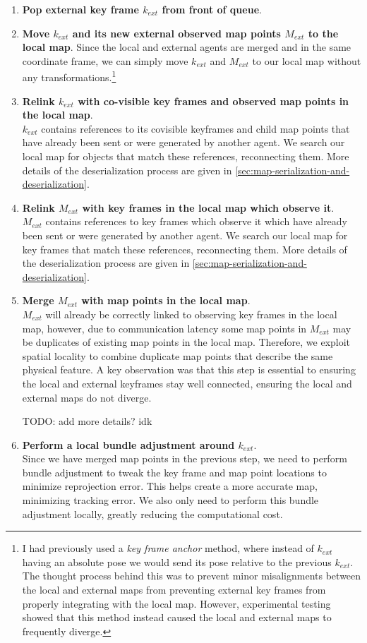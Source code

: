 \begin{enumerate}
    \item \textbf{Pop external key frame $k_{ext}$ from front of queue}.
    \item \textbf{Move $k_{ext}$ and its new external observed map points $M_{ext}$ to the local map}.
          Since the local and external agents are merged and in the same coordinate frame, we can simply move $k_{ext}$ and $M_{ext}$ to our local map without any transformations.\footnote[1]{I had previously used a \textit{key frame anchor} method, where instead of $k_{ext}$ having an absolute pose we would send its pose relative to the previous $k_{ext}$. The thought process behind this was to prevent minor misalignments between the local and external maps from preventing external key frames from properly integrating with the local map. However, experimental testing showed that this method instead caused the local and external maps to frequently diverge.}
    \item \textbf{Relink $k_{ext}$ with co-visible key frames and observed map points in the local map}. \\
          $k_{ext}$ contains references to its covisible keyframes and child map points that have already been sent or were generated by another agent. We search our local map for objects that match these references, reconnecting them. More details of the deserialization process are given in \autoref{sec:map-serialization-and-deserialization}.
    \item \textbf{Relink $M_{ext}$ with key frames in the local map which observe it}. \\
          $M_{ext}$ contains references to key frames which observe it which have already been sent or were generated by another agent. We search our local map for key frames that match these references, reconnecting them. More details of the deserialization process are given in \autoref{sec:map-serialization-and-deserialization}.
    \item \textbf{Merge $M_{ext}$ with map points in the local map}. \\
          $M_{ext}$ will already be correctly linked to observing key frames in the local map, however, due to communication latency some map points in $M_{ext}$ may be duplicates of existing map points in the local map. Therefore, we exploit spatial locality to combine duplicate map points that describe the same physical feature. A key observation was that this step is essential to ensuring the local and external keyframes stay well connected, ensuring the local and external maps do not diverge.

          TODO: add more details? idk
    \item \textbf{Perform a local bundle adjustment around $k_{ext}$}. \\
          Since we have merged map points in the previous step, we need to perform bundle adjustment to tweak the key frame and map point locations to minimize reprojection error. This helps create a more accurate map, minimizing tracking error. We also only need to perform this bundle adjustment locally, greatly reducing the computational cost.
\end{enumerate}


